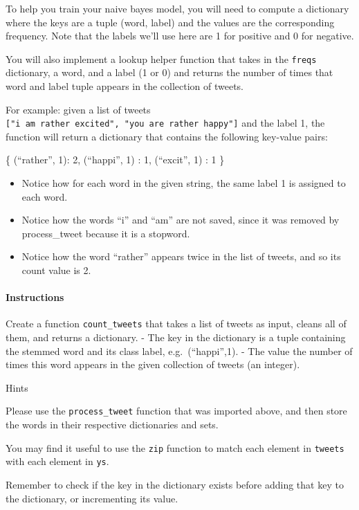 \documentclass[11pt]{article}
\providecommand{\tightlist}{%
      \setlength{\itemsep}{0pt}\setlength{\parskip}{0pt}}
\begin{document}
To help you train your naive bayes model, you will need to compute a
dictionary where the keys are a tuple (word, label) and the values are
the corresponding frequency. Note that the labels we'll use here are 1
for positive and 0 for negative.

You will also implement a lookup helper function that takes in the
\texttt{freqs} dictionary, a word, and a label (1 or 0) and returns the
number of times that word and label tuple appears in the collection of
tweets.

For example: given a list of tweets
\texttt{{[}"i\ am\ rather\ excited",\ "you\ are\ rather\ happy"{]}} and
the label 1, the function will return a dictionary that contains the
following key-value pairs:

\{ (``rather'', 1): 2, (``happi'', 1) : 1, (``excit'', 1) : 1 \}

\begin{itemize}
\tightlist
\item
  Notice how for each word in the given string, the same label 1 is
  assigned to each word.
\item
  Notice how the words ``i'' and ``am'' are not saved, since it was
  removed by process\_tweet because it is a stopword.
\item
  Notice how the word ``rather'' appears twice in the list of tweets,
  and so its count value is 2.
\end{itemize}

\hypertarget{instructions}{%
\paragraph{Instructions}\label{instructions}}

Create a function \texttt{count\_tweets} that takes a list of tweets as
input, cleans all of them, and returns a dictionary. - The key in the
dictionary is a tuple containing the stemmed word and its class label,
e.g.~(``happi'',1). - The value the number of times this word appears in
the given collection of tweets (an integer).

    Hints

Please use the \texttt{process\_tweet} function that was imported above,
and then store the words in their respective dictionaries and sets.

You may find it useful to use the \texttt{zip} function to match each
element in \texttt{tweets} with each element in \texttt{ys}.

Remember to check if the key in the dictionary exists before adding that
key to the dictionary, or incrementing its value.
\end{document}
